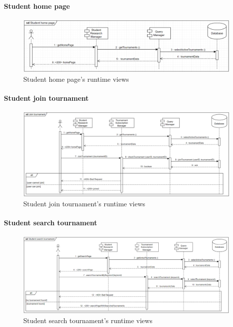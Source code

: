 \documentclass[12pt, a4paper]{report}
\begin{document}
    \paragraph*{Student home page}
    \begin{figure}[H]
        \centering
        \includegraphics[width=1.0\linewidth]{images/shprv.png}
        \caption{Student home page's runtime views}
    \end{figure}

    \paragraph*{Student join tournament}
    \begin{figure}[H]
        \centering
        \includegraphics[width=1.0\linewidth]{images/sjtrv.png}
        \caption{Student join tournament's runtime views}
    \end{figure}

    \paragraph*{Student search tournament}
    \begin{figure}[H]
        \centering
        \includegraphics[width=1.0\linewidth]{images/sstrv.png}
        \caption{Student search tournament's runtime views}
    \end{figure}
\end{document}
